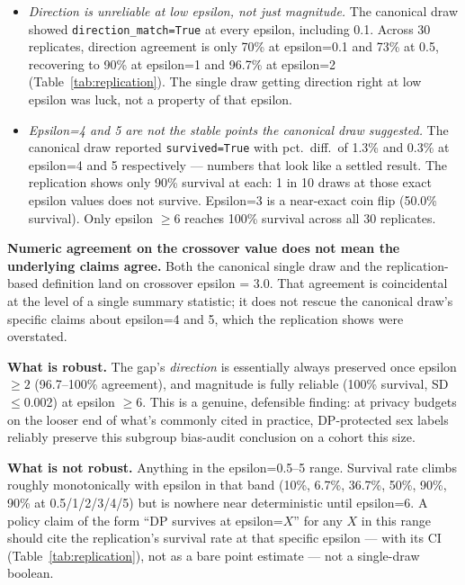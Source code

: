 \documentclass[11pt]{article}
\begin{document}
\begin{itemize}
\item \emph{Direction is unreliable at low epsilon, not just magnitude.} The canonical draw showed \texttt{direction\_match=True} at every epsilon, including 0.1. Across 30 replicates, direction agreement is only 70\% at epsilon=0.1 and 73\% at 0.5, recovering to 90\% at epsilon=1 and 96.7\% at epsilon=2 (Table~\ref{tab:replication}). The single draw getting direction right at low epsilon was luck, not a property of that epsilon.
\item \emph{Epsilon=4 and 5 are not the stable points the canonical draw suggested.} The canonical draw reported \texttt{survived=True} with pct.\ diff.\ of 1.3\% and 0.3\% at epsilon=4 and 5 respectively --- numbers that look like a settled result. The replication shows only 90\% survival at each: 1 in 10 draws at those exact epsilon values does not survive. Epsilon=3 is a near-exact coin flip (50.0\% survival). Only epsilon $\geq6$ reaches 100\% survival across all 30 replicates.
\end{itemize}

\textbf{Numeric agreement on the crossover value does not mean the underlying claims agree.} Both the canonical single draw and the replication-based definition land on crossover epsilon = 3.0. That agreement is coincidental at the level of a single summary statistic; it does not rescue the canonical draw's specific claims about epsilon=4 and 5, which the replication shows were overstated.

\textbf{What is robust.} The gap's \emph{direction} is essentially always preserved once epsilon $\geq2$ (96.7--100\% agreement), and magnitude is fully reliable (100\% survival, SD $\leq$0.002) at epsilon $\geq6$. This is a genuine, defensible finding: at privacy budgets on the looser end of what's commonly cited in practice, DP-protected sex labels reliably preserve this subgroup bias-audit conclusion on a cohort this size.

\textbf{What is not robust.} Anything in the epsilon=0.5--5 range. Survival rate climbs roughly monotonically with epsilon in that band (10\%, 6.7\%, 36.7\%, 50\%, 90\%, 90\% at 0.5/1/2/3/4/5) but is nowhere near deterministic until epsilon=6. A policy claim of the form ``DP survives at epsilon=$X$'' for any $X$ in this range should cite the replication's survival rate at that specific epsilon --- with its CI (Table~\ref{tab:replication}), not as a bare point estimate --- not a single-draw boolean.
\end{document}
